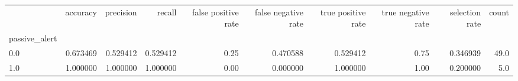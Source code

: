 \begin{tabular}{lrrrrrrrrr}
\toprule
{} &  accuracy &  precision &    recall &  false positive rate &  false negative rate &  true positive rate &  true negative rate &  selection rate &  count \\
passive\_alert &           &            &           &                      &                      &                     &                     &                 &        \\
\midrule
0.0           &  0.673469 &   0.529412 &  0.529412 &                 0.25 &             0.470588 &            0.529412 &                0.75 &        0.346939 &   49.0 \\
1.0           &  1.000000 &   1.000000 &  1.000000 &                 0.00 &             0.000000 &            1.000000 &                1.00 &        0.200000 &    5.0 \\
\bottomrule
\end{tabular}
